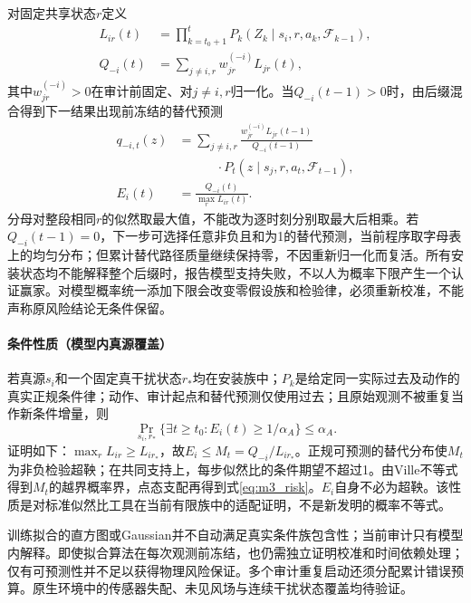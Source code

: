 对固定共享状态$r$定义
\begin{equation}
\begin{aligned}
L_{ir}(t)&=\prod_{k=t_0+1}^{t}
P_k(Z_k\mid s_i,r,a_k,\mathcal F_{k-1}),\\
Q_{-i}(t)&=\sum_{j\ne i,r}w_{jr}^{(-i)}L_{jr}(t),
\end{aligned}
\label{eq:m3_suffix}
\end{equation}
其中$w_{jr}^{(-i)}>0$在审计前固定、对$j\ne i,r$归一化。当$Q_{-i}(t-1)>0$时，由后缀混合得到下一结果出现前冻结的替代预测
\begin{equation}
\begin{aligned}
q_{-i,t}(z)&=\sum_{j\ne i,r}
\frac{w_{jr}^{(-i)}L_{jr}(t-1)}{Q_{-i}(t-1)}\\
&\hspace{3em}\cdot P_t(z\mid s_j,r,a_t,\mathcal F_{t-1}),\\
E_i(t)&=\frac{Q_{-i}(t)}{\max_rL_{ir}(t)}.
\end{aligned}
\label{eq:m3_evalue}
\end{equation}
分母对整段相同$r$的似然取最大值，不能改为逐时刻分别取最大后相乘。若$Q_{-i}(t-1)=0$，下一步可选择任意非负且和为1的替代预测，当前程序取字母表上的均匀分布；但累计替代路径质量继续保持零，不因重新归一化而复活。所有安装状态均不能解释整个后缀时，报告模型支持失败，不以人为概率下限产生一个认证赢家。对模型概率统一添加下限会改变零假设族和检验律，必须重新校准，不能声称原风险结论无条件保留。

\paragraph{条件性质（模型内真源覆盖）}
若真源$s_i$和一个固定真干扰状态$r_*$均在安装族中；$P_k$是给定同一实际过去及动作的真实正规条件律；动作、审计起点和替代预测仅使用过去；且原始观测不被重复当作新条件增量，则
\begin{equation}
\Pr_{s_i,r_*}\{\exists t\ge t_0:E_i(t)\ge1/\alpha_A\}\le\alpha_A.
\label{eq:m3_risk}
\end{equation}
证明如下：$\max_rL_{ir}\ge L_{ir_*}$，故$E_i\le M_t=Q_{-i}/L_{ir_*}$。正规可预测的替代分布使$M_t$为非负检验超鞅；在共同支持上，每步似然比的条件期望不超过1。由Ville不等式得到$M_t$的越界概率界，点态支配再得到式\eqref{eq:m3_risk}。$E_i$自身不必为超鞅。该性质是对标准似然比工具在当前有限族中的适配证明，不是新发明的概率不等式。

训练拟合的直方图或Gaussian并不自动满足真实条件族包含性；当前审计只有模型内解释。即使拟合算法在每次观测前冻结，也仍需独立证明校准和时间依赖处理；仅有可预测性并不足以获得物理风险保证。多个审计重复启动还须分配累计错误预算。原生环境中的传感器失配、未见风场与连续干扰状态覆盖均待验证。

